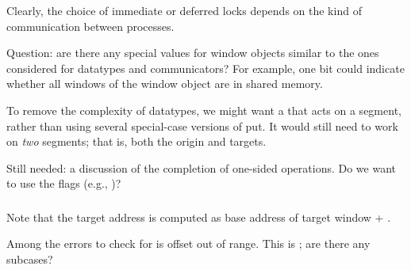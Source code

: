 \documentclass{article}
\begin{document}
Clearly, the choice of immediate or deferred locks depends on the kind
of communication between processes.

Question: are there any special values for window objects similar to the ones
considered for datatypes and communicators?  For example, one bit could
indicate whether all windows of the window object are in shared memory.

To remove the complexity of datatypes, we might want a
 that acts on a segment, rather than using several
special-case versions of put.  It would still need to work on \emph{two}
segments; that is, both the origin and targets.

Still needed: a discussion of the completion of one-sided operations.  Do we
want to use the flags (e.g., )?

\subsubsection{}

Note that the target address is computed as base address of target window +
.

Among the errors to check for is offset out of range.  This is
; are there any subcases?
\end{document}
